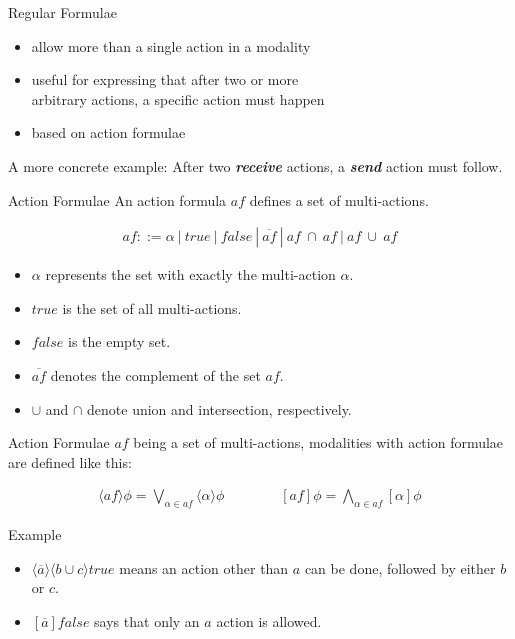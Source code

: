 \documentclass[aspectratio=1610]{beamer}
\begin{document}
  \begin{frame}{Regular Formulae}
    \begin{itemize}
      \item allow more than a single action in a modality
      \item useful for expressing that after two or more \\
            arbitrary actions, a specific action must happen
      \item based on action formulae
    \end{itemize}

    \begin{exampleblock}{A more concrete example:}
      After two \textit{\textbf{receive}} actions, a \textit{\textbf{send}} action must follow.
    \end{exampleblock}
  \end{frame}

  \begin{frame}{Action Formulae}
    An action formula $af$ defines a set of multi-actions.

    \begin{align*}
      af ::= \alpha\ |\ true\ |\ false\ |\ \overline{af}\ |\ af\ \cap\ af\ |\ af\ \cup\ af
    \end{align*}

    \begin{itemize}
      \item $\alpha$ represents the set with exactly the multi-action $\alpha$.
      \item $true$ is the set of all multi-actions.
      \item $false$ is the empty set.
      \item $\overline{af}$ denotes the complement of the set $af$.
      \item $\cup$ and $\cap$ denote union and intersection, respectively.
    \end{itemize}
  \end{frame}

  \begin{frame}{Action Formulae}
    $af$ being a set of multi-actions, modalities with action formulae are defined like this:

    \begin{align*}
      \langle{af}\rangle\phi = \bigvee_{\alpha \in af} \langle\alpha\rangle\phi
      \qquad\qquad
      [af]\phi = \bigwedge_{\alpha \in af} [\alpha]\phi
    \end{align*}

    \begin{exampleblock}{Example}
      \begin{itemize}
        \item $\langle\overline{a}\rangle\langle{b \cup c}\rangle{true}$ means an action other than $a$ can be done, followed by either $b$ or $c$.
        \item $[\overline{a}]false$ says that only an $a$ action is allowed.
      \end{itemize}
    \end{exampleblock}
  \end{frame}
\end{document}
